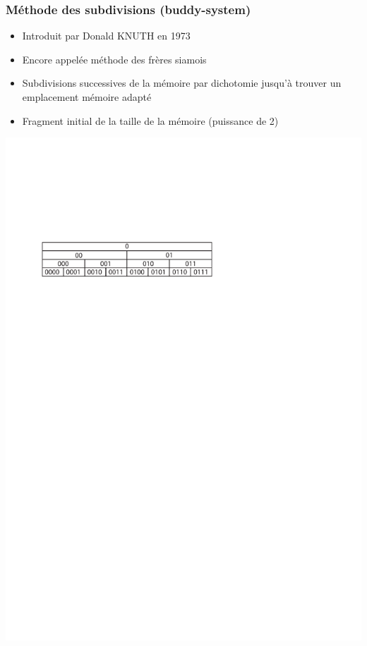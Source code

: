 \begin{frame}
\frametitle{Méthode des subdivisions (buddy-system)}
\begin{itemize}
\item Introduit par Donald KNUTH en 1973
\item Encore appelée méthode des frères siamois
\item Subdivisions successives de la mémoire par dichotomie jusqu'à trouver un emplacement mémoire adapté
\item Fragment initial de la taille de la mémoire (puissance de 2)
\end{itemize}
\includegraphics[width=\textwidth]{../illustration/buddy.pdf}
\end{frame}


